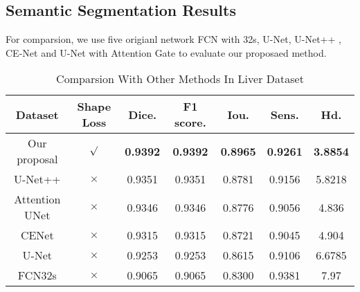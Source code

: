 \documentclass[UTF8]{article} %
\begin{document}
\subsection{Semantic Segmentation Results}
For comparsion, we use five origianl network FCN with 32s\cite{fcn}, U-Net\cite{unet}, U-Net++\cite{unet++} , CE-Net\cite{cenet} and U-Net with Attention Gate\cite{attentiongate}
to evaluate our proposaed method.


  \begin{table}[ht]
    \vspace{-2mm}
    \begin{center}\small
    \caption{Comparsion With Other Methods In Liver\cite{liver} Dataset}
    \label{dataset-table}
    \begin{tabular}{ccccccc}
      
    \toprule
    Dataset & Shape Loss & Dice. & F1 score. & Iou. & Sens. & Hd.\\
    \midrule
    Our proposal & $\surd$ & \textbf{0.9392} & \textbf{0.9392} & \textbf{0.8965} & \textbf{0.9261} & \textbf{3.8854}\\
    U-Net++ & $\times$ & 0.9351 & 0.9351 & 0.8781 & 0.9156 & 5.8218\\
     Attention UNet & $\times$ & 0.9346 & 0.9346 & 0.8776 & 0.9056 & 4.836\\
     CENet & $\times$ & 0.9315 & 0.9315 & 0.8721 & 0.9045 & 4.904\\
     U-Net & $\times$ & 0.9253 & 0.9253 & 0.8615 & 0.9106 & 6.6785\\
     FCN32s & $\times$ & 0.9065 & 0.9065 & 0.8300 & 0.9381 & 7.97\\
  \bottomrule    
    \end{tabular}
    \end{center}
    \vspace{-4mm}
  \end{table}
\end{document}
